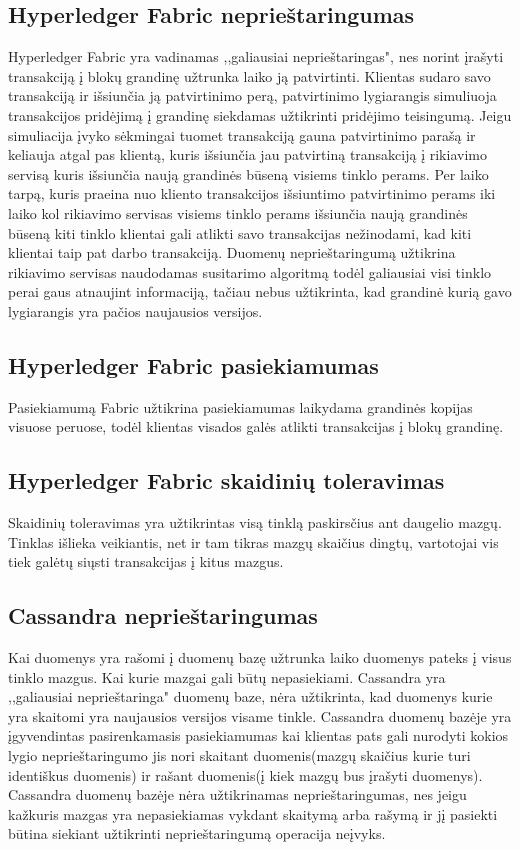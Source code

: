 \documentclass{VUMIFPSkursinis}
\begin{document}
\subsection{Hyperledger Fabric neprieštaringumas}
Hyperledger Fabric yra vadinamas ,,galiausiai neprieštaringas", nes norint įrašyti transakciją į blokų grandinę užtrunka laiko ją patvirtinti. Klientas sudaro savo transakciją ir išsiunčia ją patvirtinimo perą, patvirtinimo lygiarangis simuliuoja transakcijos pridėjimą į grandinę siekdamas užtikrinti pridėjimo teisingumą. Jeigu simuliacija įvyko sėkmingai tuomet transakciją gauna patvirtinimo parašą ir keliauja atgal pas klientą, kuris išsiunčia jau patvirtiną transakciją į rikiavimo servisą kuris išsiunčia naują grandinės būseną visiems tinklo perams. Per laiko tarpą, kuris praeina nuo kliento transakcijos išsiuntimo patvirtinimo perams iki laiko kol rikiavimo servisas visiems tinklo perams išsiunčia naują grandinės būseną kiti tinklo klientai gali atlikti savo transakcijas nežinodami, kad kiti klientai taip pat darbo transakciją. Duomenų neprieštaringumą užtikrina rikiavimo servisas naudodamas susitarimo algoritmą todėl galiausiai visi tinklo perai gaus atnaujint informaciją, tačiau nebus užtikrinta, kad grandinė kurią gavo lygiarangis yra pačios naujausios versijos. \cite{HypDoc}
\subsection{Hyperledger Fabric pasiekiamumas}
Pasiekiamumą Fabric užtikrina pasiekiamumas laikydama grandinės kopijas visuose peruose, todėl klientas visados galės atlikti transakcijas į blokų grandinę. \cite{HypDoc}
\subsection{Hyperledger Fabric skaidinių toleravimas}
Skaidinių toleravimas yra užtikrintas visą tinklą paskirsčius ant daugelio mazgų. Tinklas išlieka veikiantis, net ir tam tikras mazgų skaičius dingtų, vartotojai vis tiek galėtų siųsti transakcijas į kitus mazgus\cite{HypDoc}.
\subsection{Cassandra neprieštaringumas}
Kai duomenys yra rašomi į duomenų bazę užtrunka laiko duomenys pateks į visus tinklo mazgus. Kai kurie mazgai gali būtų nepasiekiami. Cassandra yra ,,galiausiai neprieštaringa" duomenų baze, nėra užtikrinta, kad duomenys kurie yra skaitomi yra naujausios versijos visame tinkle. 
Cassandra duomenų bazėje yra įgyvendintas pasirenkamasis pasiekiamumas kai klientas pats gali nurodyti kokios lygio neprieštaringumo jis nori skaitant duomenis(mazgų skaičius kurie turi identiškus duomenis) ir rašant duomenis(į kiek mazgų bus įrašyti duomenys). Cassandra duomenų bazėje nėra užtikrinamas neprieštaringumas, nes jeigu kažkuris mazgas yra nepasiekiamas vykdant skaitymą arba rašymą ir jį pasiekti būtina siekiant užtikrinti neprieštaringumą operacija neįvyks. \cite{CasDesk}
\end{document}
